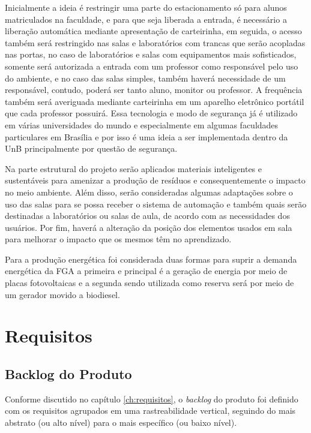 Inicialmente a ideia é restringir uma parte do estacionamento só para alunos matriculados na faculdade, e para que seja liberada a entrada, é necessário a liberação automática mediante apresentação de carteirinha, em seguida, o acesso também será restringido nas salas e laboratórios com trancas que serão acopladas nas portas, no caso de laboratórios e salas com equipamentos mais sofisticados, somente será autorizada a entrada com um professor como responsável pelo uso do ambiente, e no caso das salas simples, também haverá necessidade de um responsável, contudo, poderá ser tanto aluno, monitor ou professor. A frequência também será averiguada mediante carteirinha em um aparelho eletrônico portátil que cada professor possuirá. Essa tecnologia e modo de segurança já é utilizado em várias universidades do mundo e especialmente em algumas faculdades particulares em Brasília e por isso é uma ideia a ser implementada dentro da UnB principalmente por questão de segurança.

Na parte estrutural do projeto serão aplicados materiais inteligentes e sustentáveis para amenizar a produção de resíduos e consequentemente o impacto no meio ambiente. Além disso, serão consideradas algumas adaptações sobre o uso das salas para se possa receber o sistema de automação e também quais serão destinadas a laboratórios ou salas de aula, de acordo com as necessidades dos usuários. Por fim, haverá a alteração da posição dos elementos usados em sala para melhorar o impacto que os mesmos têm no aprendizado.

Para a produção energética foi considerada duas formas para suprir a demanda energética da FGA a primeira e principal é a geração de energia por meio de placas fotovoltaicas e a segunda sendo utilizada como reserva será por meio de um gerador movido a biodiesel.

\chapter{Requisitos\label{ch:requisitos}}
\section{Backlog do Produto}
Conforme discutido no capítulo \ref{ch:requisitos}, o \textit{backlog} do produto foi definido com os requisitos agrupados em uma rastreabilidade vertical, seguindo do mais abstrato (ou alto nível) para o mais específico (ou baixo nível).


